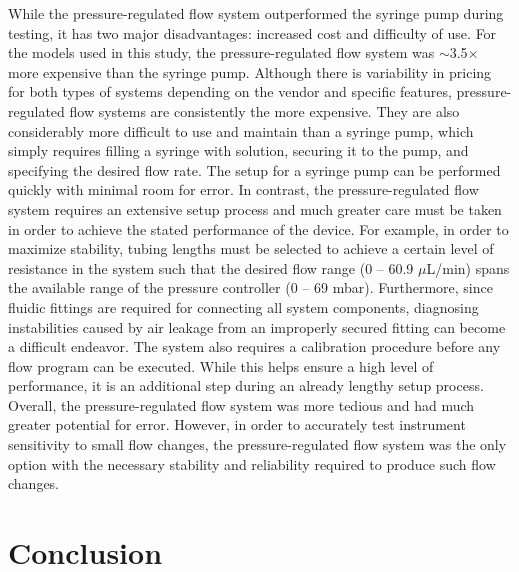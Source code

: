 \documentclass[12pt]{spieman}
\begin{document}
\begin{spacing}{2}
While the pressure-regulated flow system outperformed the syringe pump during testing, it has two major disadvantages: increased cost and difficulty of use. For the models used in this study, the pressure-regulated flow system was $\sim$3.5$\times$ more expensive than the syringe pump. Although there is variability in pricing for both types of systems depending on the vendor and specific features, pressure-regulated flow systems are consistently the more expensive. They are also considerably more difficult to use and maintain than a syringe pump, which simply requires filling a syringe with solution, securing it to the pump, and specifying the desired flow rate. The setup for a syringe pump can be performed quickly with minimal room for error. In contrast, the pressure-regulated flow system requires an extensive setup process and much greater care must be taken in order to achieve the stated performance of the device. For example, in order to maximize stability, tubing lengths must be selected to achieve a certain level of resistance in the system such that the desired flow range (0 -- 60.9 $\mu$L/min) spans the available range of the pressure controller (0 -- 69 mbar). Furthermore, since fluidic fittings are required for connecting all system components, diagnosing instabilities caused by air leakage from an improperly secured fitting can become a difficult endeavor. The system also requires a calibration procedure before any flow program can be executed. While this helps ensure a high level of performance, it is an additional step during an already lengthy setup process. Overall, the pressure-regulated flow system was more tedious and had much greater potential for error. However, in order to accurately test instrument sensitivity to small flow changes, the pressure-regulated flow system was the only option with the necessary stability and reliability required to produce such flow changes.


\section{Conclusion}
\label{sect:conclusion}


\end{spacing}
\end{document}
